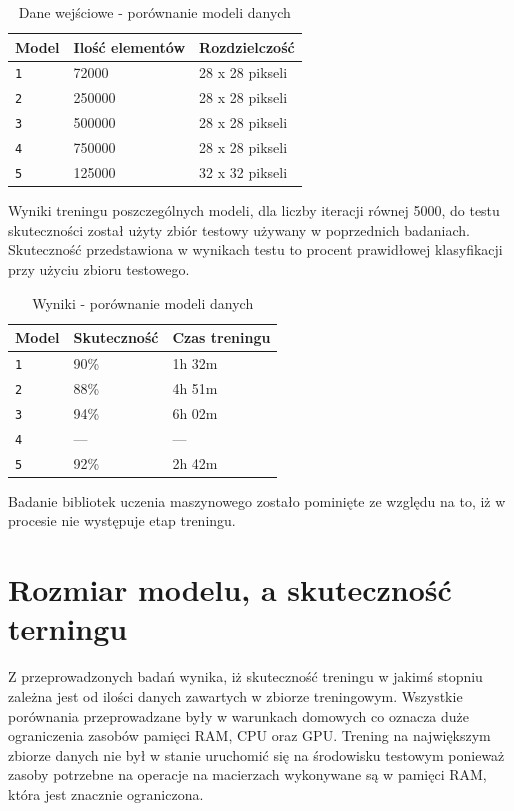 \documentclass[brudnopis]{xmgr}
\begin{document}
\begin{table}[!htb]
\begin{tabular}{|l|l|l|} \hline
Model & Ilość elementów & Rozdzielczość  \\ \hline
\texttt 1 & 72000 & 28 x 28 pikseli \\ \hline
\texttt 2 & 250000 & 28 x 28 pikseli \\ \hline
\texttt 3 & 500000 & 28 x 28 pikseli \\ \hline
\texttt 4 & 750000 & 28 x 28 pikseli \\ \hline
\texttt 5 & 125000 & 32 x 32 pikseli \\ \hline
\end{tabular}
\caption{Dane wejściowe - porównanie modeli danych}
\end{table}

Wyniki treningu poszczególnych modeli, dla liczby iteracji równej 5000, do testu skuteczności został użyty zbiór testowy używany w poprzednich badaniach. Skuteczność przedstawiona w wynikach testu to procent prawidłowej klasyfikacji przy użyciu zbioru testowego.

\begin{table}[!htb]
\begin{tabular}{|l|l|l|} \hline
Model & Skuteczność & Czas treningu  \\ \hline
\texttt 1 & 90\% & 1h 32m \\ \hline
\texttt 2 & 88\% & 4h 51m \\ \hline
\texttt 3 & 94\% & 6h 02m \\ \hline
\texttt 4 & --- & --- \\ \hline 
\texttt 5 & 92\% & 2h 42m \\ \hline
\end{tabular}
\caption{Wyniki - porównanie modeli danych}
\end{table}

Badanie bibliotek uczenia maszynowego zostało pominięte ze względu na to, iż w procesie nie występuje etap treningu.

\section{Rozmiar modelu, a skuteczność terningu}

Z przeprowadzonych badań wynika, iż skuteczność treningu w jakimś stopniu zależna jest od ilości danych zawartych w zbiorze treningowym. Wszystkie porównania przeprowadzane były w warunkach domowych co oznacza duże ograniczenia zasobów pamięci RAM, CPU oraz GPU. Trening na największym zbiorze danych nie był w stanie uruchomić się na środowisku testowym ponieważ zasoby potrzebne na operacje na macierzach wykonywane są w pamięci RAM, która jest znacznie ograniczona. 
\end{document}
